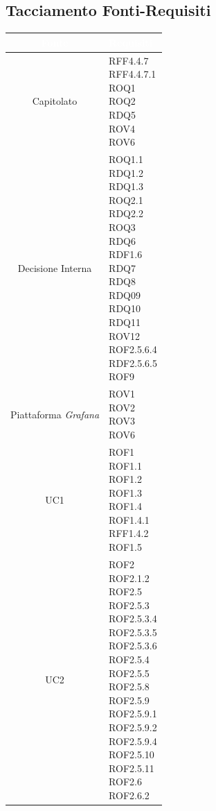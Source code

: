 \subsection{Tacciamento Fonti-Requisiti}\label{Tracciamento}
\begin{center}
\begin{longtable}[c]{|c|m{}|}
\hline
\rowcolor{bluelogo}\textbf{\textcolor{white}{Fonte}} & \textbf{\textcolor{white}{Requisiti}}\\
\hline \hline
\endhead
Capitolato & \makecell{RFF4.4.7\\RFF4.4.7.1\\ROQ1\\ROQ2\\RDQ5\\ROV4\\ROV6}\\
\hline
\rowcolor{grigio}Decisione Interna & \makecell{ROQ1.1\\RDQ1.2 \\ RDQ1.3\\ROQ2.1\\RDQ2.2\\ROQ3\\RDQ6\\RDF1.6\\RDQ7\\RDQ8 \\ RDQ09 \\ RDQ10 \\ RDQ11\\ROV12\\ROF2.5.6.4\\RDF2.5.6.5\\ROF9}\\
\hline
Piattaforma \textit{Grafana} & \makecell{ROV1\\ROV2\\ROV3\\ROV6}\\
\hline
\rowcolor{grigio}UC1 & \makecell{ROF1\\ROF1.1\\ROF1.2\\ROF1.3\\ROF1.4\\ROF1.4.1\\RFF1.4.2\\ROF1.5}\\
\hline
UC2 & \makecell{ROF2\\ROF2.1.2\\ROF2.5\\ROF2.5.3\\ROF2.5.3.4\\ROF2.5.3.5\\ROF2.5.3.6\\ROF2.5.4\\ROF2.5.5\\ROF2.5.8\\ROF2.5.9\\ROF2.5.9.1\\ROF2.5.9.2\\ROF2.5.9.4\\ROF2.5.10\\ ROF2.5.11\\ROF2.6\\ROF2.6.2}\\

\end{longtable}
\end{center}
